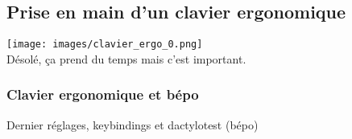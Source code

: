 	\subsection*{Prise en main d’un clavier ergonomique}
	\texttt{[image: images/clavier\_ergo\_0.png]}\\
	Désolé, ça prend du temps mais c’est important.
	\subsubsection{Clavier ergonomique et bépo}
	Dernier réglages, keybindings et dactylotest (bépo)
